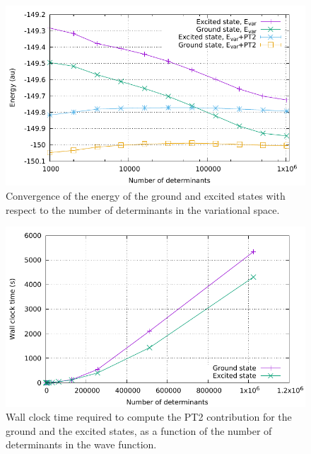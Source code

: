 \documentclass[./thesis.tex]{subfiles}
\begin{document}
\begin{figure}[h]
	\begin{center}
		\includegraphics[width=0.8\columnwidth]{figures/pt2/cn3_energy}
		\caption{Convergence of the energy of the ground and excited states with respect to the number of determinants in the variational space.}
		\label{fig:energy_pt2}
	\end{center}
\end{figure}
\begin{figure}[h]
	\begin{center}
		\includegraphics[width=0.8\columnwidth]{figures/pt2/scaling_det}
		\caption{Wall clock time required to compute the PT2 contribution for the ground and the excited states, as a function of the number of determinants in the wave function.}
		\label{fig:scaling_det_pt2}
	\end{center}
\end{figure}
\end{document}
